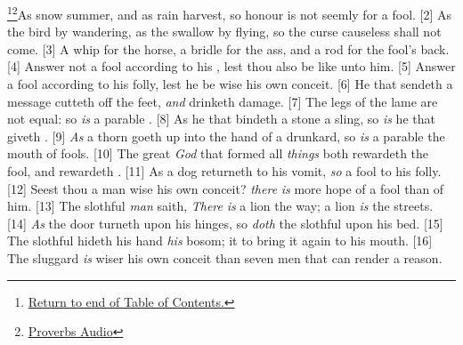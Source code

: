 \footnote{\textcolor[cmyk]{0.99998,1,0,0}{\hyperlink{TOC}{Return to end of Table of Contents.}}}\footnote{\href{https://www.audioverse.org/english/audiobibles/books/ENGKJV/O/Prov/1}{\textcolor[cmyk]{0.99998,1,0,0}{Proverbs Audio}}}\textcolor[cmyk]{0.99998,1,0,0}{As snow  summer, and as rain  harvest, so honour is not seemly for a fool.}
[2] \textcolor[cmyk]{0.99998,1,0,0}{As the bird by wandering, as the swallow by flying, so the curse causeless shall not come.}
[3] \textcolor[cmyk]{0.99998,1,0,0}{A whip for the horse, a bridle for the ass, and a rod for the fool's back.}
[4] \textcolor[cmyk]{0.99998,1,0,0}{Answer not a fool according to his , lest thou also be like unto him.}
[5] \textcolor[cmyk]{0.99998,1,0,0}{Answer a fool according to his folly, lest he be wise  his own conceit.}
[6] \textcolor[cmyk]{0.99998,1,0,0}{He that sendeth a message  cutteth off the feet, \emph{and} drinketh damage.}
[7] \textcolor[cmyk]{0.99998,1,0,0}{The legs of the lame are not equal: so \emph{is} a parable  .}
[8] \textcolor[cmyk]{0.99998,1,0,0}{As he that bindeth a stone  a sling, so \emph{is} he that giveth .}
[9] \textcolor[cmyk]{0.99998,1,0,0}{\emph{As} a thorn goeth up into the hand of a drunkard, so \emph{is} a parable  the mouth of fools.}
[10] \textcolor[cmyk]{0.99998,1,0,0}{The great \emph{God} that formed all \emph{things} both rewardeth the fool, and rewardeth .}
[11] \textcolor[cmyk]{0.99998,1,0,0}{As a dog returneth to his vomit, \emph{so} a fool  to his folly.}
[12] \textcolor[cmyk]{0.99998,1,0,0}{Seest thou a man wise  his own conceit? \emph{there} \emph{is} more hope of a fool than of him.}
[13] \textcolor[cmyk]{0.99998,1,0,0}{The slothful \emph{man} saith, \emph{There} \emph{is} a lion  the way; a lion \emph{is}  the streets.}
[14] \textcolor[cmyk]{0.99998,1,0,0}{\emph{As} the door turneth upon his hinges, so \emph{doth} the slothful upon his bed.}
[15] \textcolor[cmyk]{0.99998,1,0,0}{The slothful hideth his hand  \emph{his} bosom; it  to bring it again to his mouth.}
[16] \textcolor[cmyk]{0.99998,1,0,0}{The sluggard \emph{is} wiser  his own conceit than seven men that can render a reason.}
